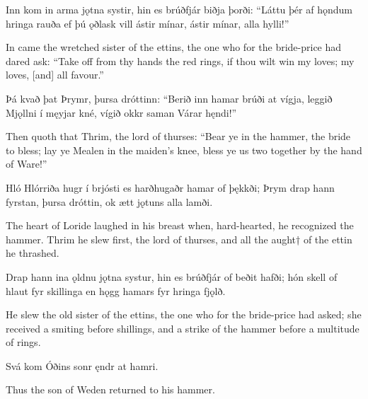 Inn kom in arma \hld jǫtna systir,
hin es brúðfjár \hld biðja þorði:
“Láttu þér af hǫndum \hld hringa rauða
ef þú ǫðlask vill \hld ástir mínar,
ástir mínar, \hld alla hylli!”

In came the wretched sister of the ettins, the one who for the bride-price had dared ask: “Take off from thy hands the red rings, if thou wilt win my loves; my loves, [and] all favour.”\footnotemark[1]

Þá kvað þat Þrymr, \hld þursa dróttinn:
“Berið inn hamar \hld brúði at vígja,
leggið Mjǫllni \hld í męyjar kné,
vígið okkr saman \hld Várar hęndi!”

Then quoth that Thrim, the lord of thurses: “Bear ye in the hammer, the bride to bless; lay ye Mealen in the maiden’s knee, bless ye us two together by the hand of Ware!\footnotemark[1]”

Hló Hlórriða \hld hugr í brjósti
es harðhugaðr \hld hamar of þękkði;
Þrym drap hann fyrstan, \hld þursa dróttin,
ok ætt jǫtuns \hld alla lamði. 

The heart of Loride laughed in his breast when, hard-hearted, he recognized the hammer. Thrim he slew first, the lord of thurses, and all the aught† of the ettin he thrashed.

Drap hann ina ǫldnu \hld jǫtna systur,
hin es brúðfjár \hld of beðit hafði;
hón skell of hlaut \hld fyr skillinga
en hǫgg hamars \hld fyr hringa fjǫlð.

He slew the old sister of the ettins, the one who for the bride-price had asked; she received a smiting before shillings, and a strike of the hammer before a multitude of rings.

Svá kom Óðins sonr \hld ęndr at hamri. 

Thus the son of Weden returned to his hammer.
